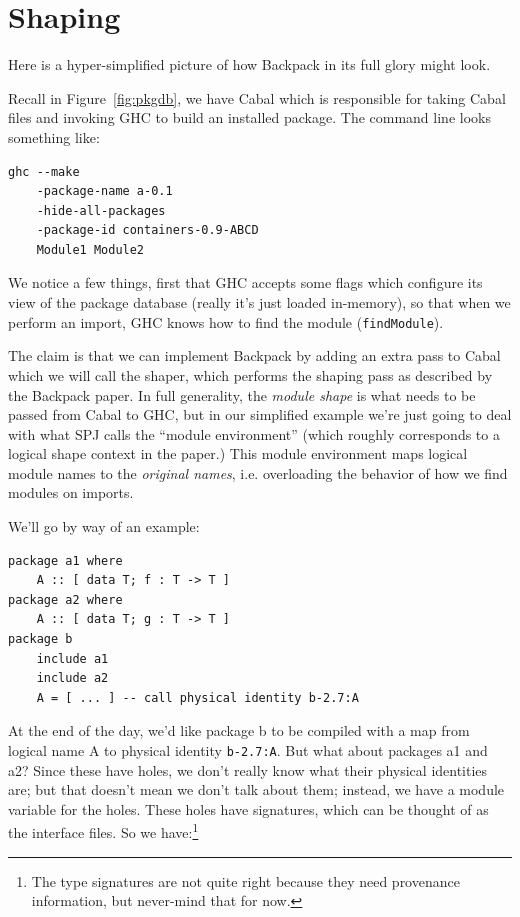 \documentclass{article}
\begin{document}
\section{Shaping}\label{sec:shaping}

Here is a hyper-simplified picture of how Backpack in its full glory might look.

Recall in Figure~\ref{fig:pkgdb}, we have Cabal which is responsible for
taking Cabal files and invoking GHC to build an installed package.  The
command line looks something like:

\begin{verbatim}
ghc --make
    -package-name a-0.1
    -hide-all-packages
    -package-id containers-0.9-ABCD
    Module1 Module2
\end{verbatim}

We notice a few things, first that GHC accepts some flags which
configure its view of the package database (really it's just loaded
in-memory), so that when we perform an import, GHC knows how to find the
module (\verb|findModule|).

The claim is that we can implement Backpack by adding an extra pass
to Cabal which we will call the shaper, which performs the shaping pass
as described by the Backpack paper.  In full generality, the \emph{module shape}
is what needs to be passed from Cabal to GHC, but in our simplified example
we're just going to deal with what SPJ calls the ``module environment'' (which
roughly corresponds to a logical shape context in the paper.)  This module
environment maps logical module names to the \emph{original names}, i.e.
overloading the behavior of how we find modules on imports.

We'll go by way of an example:

\begin{verbatim}
package a1 where
    A :: [ data T; f : T -> T ]
package a2 where
    A :: [ data T; g : T -> T ]
package b
    include a1
    include a2
    A = [ ... ] -- call physical identity b-2.7:A
\end{verbatim}

At the end of the day, we'd like package b to be compiled with a map from
logical name A to physical identity \verb|b-2.7:A|. But what about packages
a1 and a2?  Since these have holes, we don't really know what their physical
identities are; but that doesn't mean we don't talk about them; instead,
we have a module variable for the holes.  These holes have signatures, which can be thought
of as the interface files.  So we have:\footnote{The type signatures are not quite right because they need provenance information, but never-mind that for now.} \\
\end{document}
